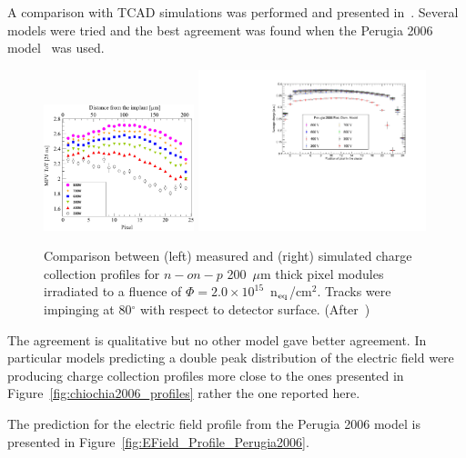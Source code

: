 A comparison with TCAD simulations was performed and presented in~\cite{bomben_rd50_Santander}. 
Several models were tried and the best agreement was found when the Perugia 2006 model~\cite{Moscatelli-2006} was used.
\begin{figure}[!htpb]
\centering
\includegraphics[width=0.39\textwidth]{Savic_high_phi.jpg}
\includegraphics[width=0.59\textwidth]{Pixel_Profile_Perugia2006.pdf}
\caption{\label{fig:Pixel_Profile_Perugia2006}Comparison between (left) measured and (right) 
simulated charge collection profiles for $n-on-p$ 200~$\mu$m thick  pixel modules irradiated to a fluence of 
$\Phi = 2.0\times10^{15}$~n$_{\rm eq}$/cm$^2$. Tracks were impinging at 80$^{\circ}$ with 
respect to detector surface. (After~\cite{Macchiolo:2016xzi,bomben_rd50_Santander})}
\end{figure}
The agreement is qualitative but no other model gave better agreement. In particular models 
predicting a double peak distribution of the electric field were producing charge collection profiles 
more close to the ones presented in Figure~\ref{fig:chiochia2006_profiles} rather the one 
reported here. 

The prediction for the electric field profile from the Perugia 2006 model is presented in 
Figure~\ref{fig:EField_Profile_Perugia2006}.

